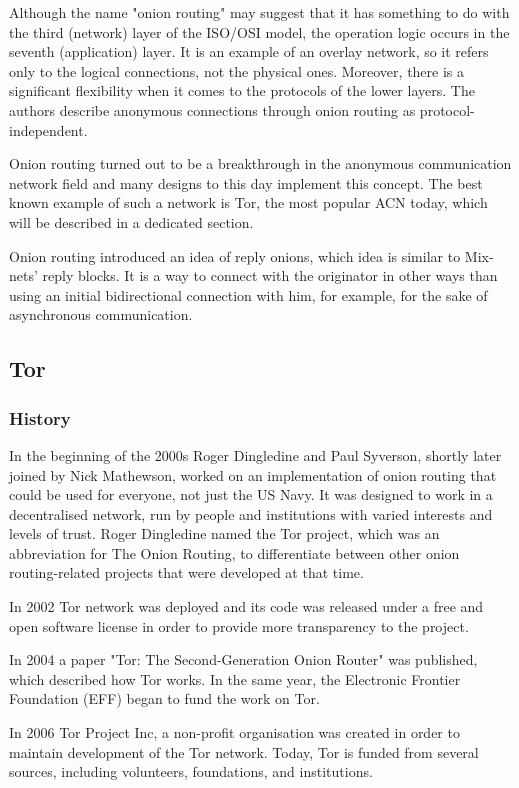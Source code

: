 Although the name "onion routing" may suggest that it has something to do with the third (network) layer of the ISO/OSI model, the operation logic occurs in the seventh (application) layer. It is an example of an overlay network, so it refers only to the logical connections, not the physical ones. Moreover, there is a significant flexibility when it comes to the protocols of the lower layers. The authors describe anonymous connections through onion routing as protocol-independent.

Onion routing turned out to be a breakthrough in the anonymous communication network field and many designs to this day implement this concept. The best known example of such a network is Tor, the most popular ACN today, which will be described in a dedicated section.

Onion routing introduced an idea of reply onions, which idea is similar to Mix-nets’ reply blocks. It is a way to connect with the originator in other ways than using an initial bidirectional connection with him, for example, for the sake of asynchronous communication.

\subsection{Tor}

\subsubsection{History}
In the beginning of the 2000s Roger Dingledine and Paul Syverson, shortly later joined by Nick Mathewson, worked on an implementation of onion routing that could be used for everyone, not just the US Navy. It was designed to work in a decentralised network, run by people and institutions with varied interests and levels of trust. Roger Dingledine named the Tor project, which was an abbreviation for The Onion Routing, to differentiate between other onion routing-related projects that were developed at that time.

In 2002 Tor network was deployed and its code was released under a free and open software license in order to provide more transparency to the project.

In 2004 a paper "Tor: The Second-Generation Onion Router" \cite{tor-design} was published, which described how Tor works. In the same year, the Electronic Frontier Foundation (EFF) began to fund the work on Tor.

In 2006 Tor Project Inc, a non-profit organisation was created in order to maintain development of the Tor network. Today, Tor is funded from several sources, including volunteers, foundations, and institutions.

